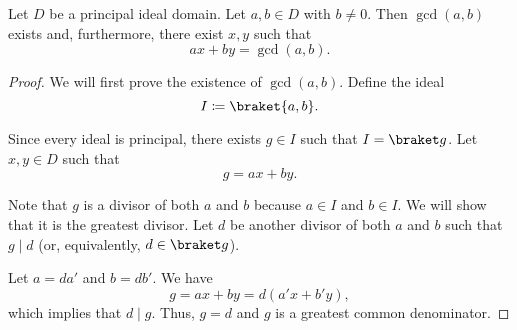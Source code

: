 \begin{theorem}\label{thm:bezout_identity}
  Let \( D \) be a principal ideal domain. Let \( a, b \in D \) with \( b \neq 0 \). Then \( \gcd(a, b) \) exists and, furthermore, there exist \( x, y \) such that
  \begin{equation*}
    ax + by = \gcd(a, b).
  \end{equation*}
\end{theorem}
\begin{proof}
  We will first prove the existence of \( \gcd(a, b) \). Define the ideal
  \begin{equation*}
    I \coloneqq \braket{a, b}.
  \end{equation*}

  Since every ideal is principal, there exists \( g \in I \) such that \( I = \braket g \). Let \( x, y \in D \) such that
  \begin{equation*}
    g = ax + by.
  \end{equation*}

  Note that \( g \) is a divisor of both \( a \) and \( b \) because \( a \in I \) and \( b \in I \). We will show that it is the greatest divisor. Let \( d \) be another divisor of both \( a \) and \( b \) such that \( g \mid d \) (or, equivalently, \( d \in \braket g \)).

  Let \( a = da' \) and \( b = db' \). We have
  \begin{equation*}
    g = ax + by = d(a'x + b'y),
  \end{equation*}
  which implies that \( d \mid g \). Thus, \( g = d \) and \( g \) is a greatest common denominator.
\end{proof}

